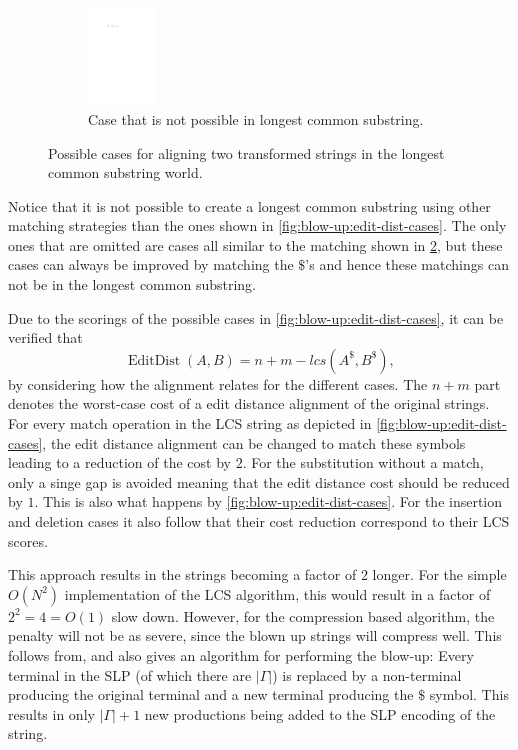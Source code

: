 \documentclass[twoside,11pt,openright]{report}
\newcommand{\EditDist}{\operatorname{EditDist}}
\begin{document}
\begin{figure}[!htb]
\begin{subfigure}{0.8\textwidth}
    \centering
    \includegraphics[width=0.2\textwidth]{images/blow-up-not-possible-case}
    \caption{Case that is not possible in longest common substring.}
    \label{fig:blow-up:not-possible}
  \end{subfigure}
  \caption{Possible cases for aligning two transformed strings in the longest common substring world.}
\end{figure}%

Notice that it is not possible to create a longest common substring using other matching strategies than the ones shown in \cref{fig:blow-up:edit-dist-cases}. The only ones that are omitted are cases all similar to the matching shown in \cref{fig:blow-up:not-possible}, but these cases can always be improved by matching the $\$$'s and hence these matchings can not be in the longest common substring.

Due to the scorings of the possible cases in \cref{fig:blow-up:edit-dist-cases}, it can be verified that
\[
  \EditDist(A, B) = n + m - lcs(A^{\$}, B^{\$}),
\]
by considering how the alignment relates for the different cases. The $n + m$ part denotes the worst-case cost of a edit distance alignment of the original strings. For every match operation in the LCS string as depicted in \cref{fig:blow-up:edit-dist-cases}, the edit distance alignment can be changed to match these symbols leading to a reduction of the cost by $2$. For the substitution without a match, only a singe gap is avoided meaning that the edit distance cost should be reduced by $1$. This is also what happens by \cref{fig:blow-up:edit-dist-cases}. For the insertion and deletion cases it also follow that their cost reduction correspond to their LCS scores.

This approach results in the strings becoming a factor of $2$ longer. For the simple $O(N^2)$ implementation of the LCS algorithm, this would result in a factor of $2^2 = 4 = O(1)$ slow down. However, for the compression based algorithm, the penalty will not be as severe, since the blown up strings will compress well. This follows from, and also gives an algorithm for performing the blow-up: Every terminal in the SLP (of which there are $|\Gamma|$) is replaced by a non-terminal producing the original terminal and a new terminal producing the $\$$ symbol. This results in only $|\Gamma| + 1$ new productions being added to the SLP encoding of the string.
\end{document}
